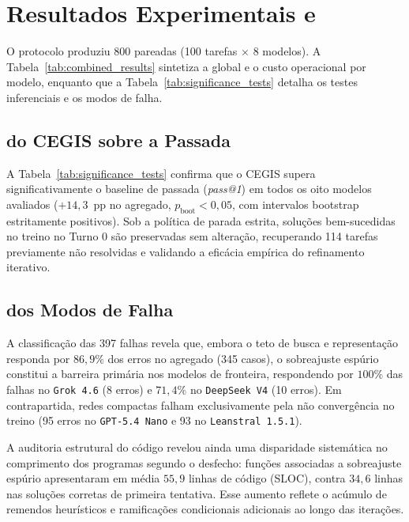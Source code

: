 \documentclass[letterpaper]{article} %
\begin{document}
\section{Resultados Experimentais e \Analise{}}
\label{sec:resultados}

O protocolo produziu 800 \execucoes{} pareadas (100 tarefas $\times$ 8 modelos). A Tabela~\ref{tab:combined_results} sintetiza a \acuracia{} global e o custo operacional por modelo, enquanto que a Tabela~\ref{tab:significance_tests} detalha os testes inferenciais e os modos de falha.

\subsection{\Eficacia{} do CEGIS sobre a Passada \Unica{}}
\label{sec:cegis_eficacia}
A Tabela~\ref{tab:significance_tests} confirma que o CEGIS supera significativamente o baseline de passada \unica{} (\textit{pass@1}) em todos os oito modelos avaliados ($+14{,}3$~pp no agregado, $p_{\text{boot}} < 0{,}05$, com intervalos bootstrap estritamente positivos). Sob a pol{\'{i}}tica de parada estrita, solu{\c{c}}{\~o}es bem-sucedidas no treino no Turno 0 s{\~a}o preservadas sem altera{\c{c}}{\~a}o, recuperando 114 tarefas previamente n{\~a}o resolvidas e validando a efic{\'{a}}cia emp{\'{i}}rica do refinamento iterativo.

\subsection{\Decomposicao{} dos Modos de Falha}
\label{sec:modos_falha}
A classifica{\c{c}}{\~a}o das 397 falhas revela que, embora o teto de busca e representa{\c{c}}{\~a}o responda por $86{,}9\%$ dos erros no agregado (345 casos), o sobreajuste esp{\'{u}}rio constitui a barreira prim{\'{a}}ria nos modelos de fronteira, respondendo por $100\%$ das falhas no \texttt{Grok 4.6} (8 erros) e $71{,}4\%$ no \texttt{DeepSeek V4} (10 erros). Em contrapartida, redes compactas falham exclusivamente pela n{\~a}o converg{\^{e}}ncia no treino (95 erros no \texttt{GPT-5.4 Nano} e 93 no \texttt{Leanstral 1.5.1}).

A auditoria estrutural do c{\'{o}}digo revelou ainda uma disparidade sistem{\'{a}}tica no comprimento dos programas segundo o desfecho: fun{\c{c}}{\~o}es associadas a sobreajuste esp{\'{u}}rio apresentaram em m{\'{e}}dia $55{,}9$ linhas de c{\'{o}}digo (SLOC), contra $34{,}6$ linhas nas solu{\c{c}}{\~o}es corretas de primeira tentativa. Esse aumento reflete o ac{\'{u}}mulo de remendos heur{\'{i}}sticos e ramifica{\c{c}}{\~o}es condicionais adicionais ao longo das itera{\c{c}}{\~o}es.
\end{document}
